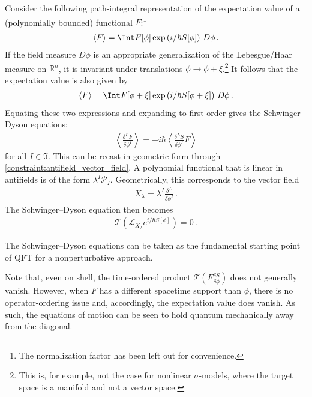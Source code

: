     Consider the following path-integral representation of the expectation value of a (polynomially bounded) functional $F$:\footnote{The normalization factor has been left out for convenience.}
    \begin{gather}
        \langle F\rangle = \Int F[\phi]\exp\left(i/\hbar S[\phi]\right)\,D\phi\,.
    \end{gather}
    If the field measure $D\phi$ is an appropriate generalization of the Lebesgue/Haar measure on $\mathbb{R}^n$, it is invariant under translations $\phi\longrightarrow\phi+\xi$.\footnote{This is, for example, not the case for nonlinear $\sigma$-models, where the target space is a manifold and not a vector space.} It follows that the expectation value is also given by
    \begin{gather}
        \langle F\rangle = \Int F[\phi+\xi]\exp\left(i/\hbar S[\phi+\xi]\right)\,D\phi\,.
    \end{gather}
    Equating these two expressions and expanding to first order gives the Schwinger--Dyson equations:
    \begin{gather}
        \label{qft:schwinger_dyson_equations}
        \left\langle\frac{\delta^LF}{\delta\phi^I}\right\rangle = -i\hbar\left\langle\frac{\delta^LS}{\delta\phi^I}F\right\rangle
    \end{gather}
    for all $I\in\mathfrak{I}$. This can be recast in geometric form through \cref{constraint:antifield_vector_field}. A polynomial functional that is linear in antifields is of the form $\lambda^I\mathcal{P}_I$. Geometrically, this corresponds to the vector field
    \begin{gather}
        X_\lambda = \lambda^I\frac{\delta^L}{\delta\phi^I}\,.
    \end{gather}
    The Schwinger--Dyson equation then becomes
    \begin{gather}
        \mathcal{T}\left(\mathcal{L}_{X_\lambda}e^{i/\hbar S[\phi]}\right)=0\,.
    \end{gather}
    
    \begin{remark}
        The Schwinger--Dyson equations can be taken as the fundamental starting point of QFT for a nonperturbative approach.
    \end{remark}

    Note that, even on shell, the time-ordered product $\mathcal{T}\left(F\frac{\delta S}{\delta\phi}\right)$ does not generally vanish. However, when $F$ has a different spacetime support than $\phi$, there is no operator-ordering issue and, accordingly, the expectation value does vanish. As such, the equations of motion can be seen to hold quantum mechanically away from the diagonal.

